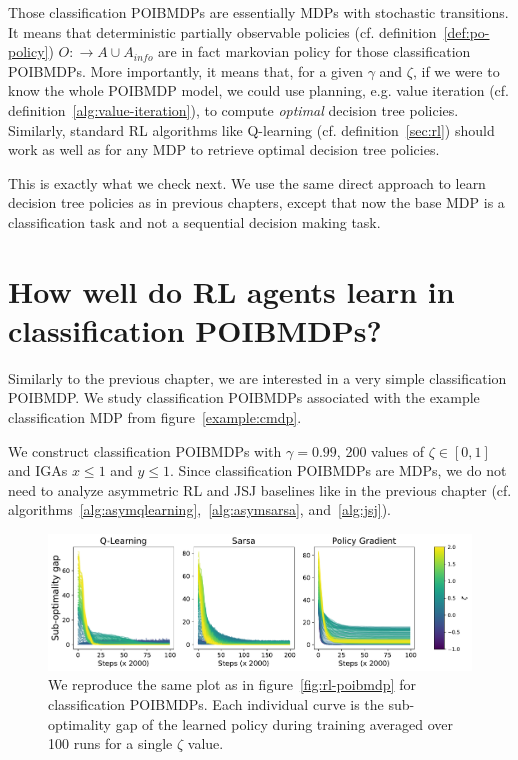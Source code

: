 Those classification POIBMDPs are essentially MDPs with stochastic transitions.
It means that deterministic partially observable policies (cf. definition~\ref{def:po-policy}) $O:\rightarrow A\cup A_{info}$ are in fact markovian policy for those classification POIBMDPs.
More importantly, it means that, for a given $\gamma$ and $\zeta$, if we were to know the whole POIBMDP model, we could use planning, e.g. value iteration (cf. definition~\ref{alg:value-iteration}), to compute \textit{optimal} decision tree policies.
Similarly, standard RL algorithms like Q-learning (cf. definition~\ref{sec:rl}) should work as well as for any MDP to retrieve optimal decision tree policies.

This is exactly what we check next.
We use the same direct approach to learn decision tree policies as in previous chapters, except that now the base MDP is a classification task and not a sequential decision making task.

\section{How well do RL agents learn in classification POIBMDPs?}
Similarly to the previous chapter, we are interested in a very simple classification POIBMDP.
We study classification POIBMDPs associated with the example classification MDP from figure~\ref{example:cmdp}.

We construct classification POIBMDPs with $\gamma=0.99$, 200 values of $\zeta \in [0,1]$ and IGAs $x\leq 1$ and $y\leq 1$.
Since classification POIBMDPs are MDPs, we do not need to analyze asymmetric RL and JSJ baselines like in the previous chapter (cf. algorithms~\ref{alg:asymqlearning},~\ref{alg:asymsarsa}, and~\ref{alg:jsj}).

\begin{figure}
    \centering
    \includegraphics[width=1\textwidth]{images/images_part1/learning_curves_classif.pdf}
    \caption{We reproduce the same plot as in figure~\ref{fig:rl-poibmdp} for classification POIBMDPs. Each individual curve is the sub-optimality gap of the learned policy during training averaged over 100 runs for a single $\zeta$ value.}\label{fig:rl-classif-poibmdp}
\end{figure}

